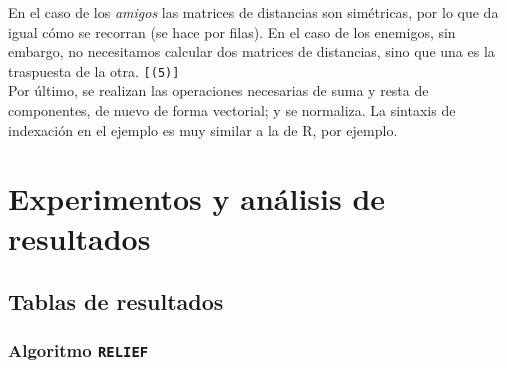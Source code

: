 \documentclass[11pt]{article}
\theoremstyle{plain}
\theoremstyle{definition}
\begin{document}
En el caso de los \textit{amigos} las matrices de distancias son simétricas, por lo que da igual cómo se recorran (se hace por filas). En el caso de los enemigos, sin embargo, no necesitamos calcular dos matrices de distancias, sino que una es la traspuesta de la otra. \texttt{[(5)]} \\

Por último, se realizan las operaciones necesarias de suma y resta de componentes, de nuevo de forma vectorial; y se normaliza. La sintaxis de indexación en el ejemplo es muy similar a la de R, por ejemplo.

\section{Experimentos y análisis de resultados}
\subsection{Tablas de resultados}
\subsubsection{Algoritmo \texttt{RELIEF}}
\end{document}
